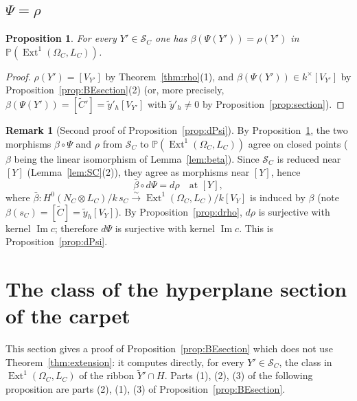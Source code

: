 \documentclass[11pt,reqno]{amsart}
\theoremstyle{plain}
\newtheorem{proposition}[theorem]{Proposition}
\theoremstyle{definition}
\newtheorem{remark}[theorem]{Remark}
\newcommand{\PP}{\mathbb{P}}
\newcommand{\Ext}{\operatorname{Ext}}
\renewcommand{\Im}{\operatorname{Im}}
\newcommand{\Yt}{\widetilde{Y}}
\newcommand{\Ct}{\widetilde{C}}
\newcommand{\yt}{\tilde{y}}
\newcommand{\SC}{\mathcal{S}_C}
\begin{document}
\subsection{\texorpdfstring{$\Psi=\rho$}{Psi = rho}}\label{subsec:Psirho}

\begin{proposition}\label{prop:Psi=rho}
For every $Y'\in\SC$ one has $\beta(\Psi(Y'))=\rho(Y')$ in $\PP(\Ext^1(\Omega_C,L_C))$.
\end{proposition}

\begin{proof}
$\rho(Y')=[V_{Y'}]$ by Theorem~\ref{thm:rho}(1), and $\beta(\Psi(Y'))\in k^{\times}[V_{Y'}]$ by Proposition~\ref{prop:BEsection}(2) (or, more precisely, $\beta(\Psi(Y'))=[\Ct']=\yt'_h[V_{Y'}]$ with $\yt'_h\ne0$ by Proposition~\ref{prop:section}).
\end{proof}

\begin{remark}[Second proof of Proposition~\ref{prop:dPsi}]
By Proposition~\ref{prop:Psi=rho}, the two morphisms $\beta\circ\Psi$ and $\rho$ from $\SC$ to $\PP(\Ext^1(\Omega_C,L_C))$ agree on closed points ($\beta$ being the linear isomorphism of Lemma~\ref{lem:beta}). Since $\SC$ is reduced near $[Y]$ (Lemma~\ref{lem:SC}(2)), they agree as morphisms near $[Y]$, hence
\[
\bar\beta\circ d\Psi=d\rho\quad\text{at }[Y],
\]
where $\bar\beta\colon H^0(N_C\otimes L_C)/k\,s_C\xrightarrow{\sim}\Ext^1(\Omega_C,L_C)/k[V_Y]$ is induced by $\beta$ (note $\beta(s_C)=[\Ct]=\yt_h[V_Y]$). By Proposition~\ref{prop:drho}, $d\rho$ is surjective with kernel $\Im c$; therefore $d\Psi$ is surjective with kernel $\Im c$. This is Proposition~\ref{prop:dPsi}.
\end{remark}

\section{The class of the hyperplane section of the carpet}\label{sec:direct}

This section gives a proof of Proposition~\ref{prop:BEsection} which does not use Theorem~\ref{thm:extension}: it computes directly, for every $Y'\in\SC$, the class in $\Ext^1(\Omega_C,L_C)$ of the ribbon $\Yt'\cap H$. Parts (1), (2), (3) of the following proposition are parts (2), (1), (3) of Proposition~\ref{prop:BEsection}.
\end{document}
